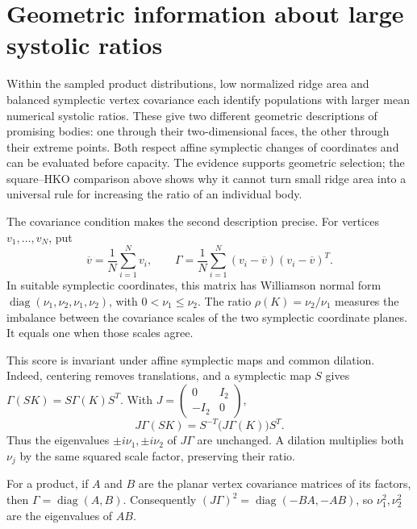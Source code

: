 \section{Geometric information about large systolic ratios}

Within the sampled product distributions, low normalized ridge area and
balanced symplectic vertex covariance each identify populations with
larger mean numerical systolic ratios. These give two different geometric
descriptions of promising bodies: one through their two-dimensional faces,
the other through their extreme points. Both respect affine symplectic
changes of coordinates and can be evaluated before capacity. The evidence
supports geometric selection; the square--HKO comparison above shows why
it cannot turn small ridge area into a universal rule for increasing the
ratio of an individual body.

The covariance condition makes the second description precise. For
vertices $v_1,\ldots,v_N$, put
\[
 \overline v=\frac1N\sum_{i=1}^Nv_i,
 \qquad \Gamma=\frac1N\sum_{i=1}^N(v_i-\overline v)(v_i-\overline v)^T.
\]
In suitable symplectic coordinates, this matrix has Williamson normal
form $\operatorname{diag}(\nu_1,\nu_2,\nu_1,\nu_2)$, with
$0<\nu_1\leq\nu_2$. The ratio $\rho(K)=\nu_2/\nu_1$
measures the imbalance between the covariance scales of the two
symplectic coordinate planes. It equals one when those scales agree.

This score is invariant under affine symplectic maps and common dilation.
Indeed, centering removes translations, and a symplectic map $S$ gives
$\Gamma(SK)=S\Gamma(K)S^T$. With
$J=\left(\begin{smallmatrix}0&I_2\\-I_2&0\end{smallmatrix}\right)$,
\[
 J\Gamma(SK)=S^{-T}\bigl(J\Gamma(K)\bigr)S^T.
\]
Thus the eigenvalues $\pm i\nu_1,\pm i\nu_2$ of $J\Gamma$ are unchanged.
A dilation multiplies both $\nu_j$ by the same squared scale factor,
preserving their ratio.

For a product, if $A$ and $B$ are the planar vertex covariance matrices
of its factors, then $\Gamma=\operatorname{diag}(A,B)$. Consequently
$(J\Gamma)^2=\operatorname{diag}(-BA,-AB)$, so $\nu_1^2,\nu_2^2$ are
the eigenvalues of $AB$.

